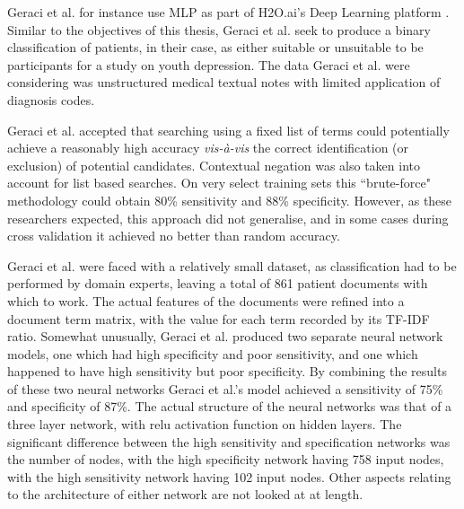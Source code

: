 Geraci et al. for instance use MLP as part of H2O.ai's Deep Learning platform \cite{geraci2017applying}. Similar to the objectives of this thesis, Geraci et al. seek to produce a binary classification of patients, in their case, as either suitable or unsuitable to be participants for a study on youth depression. The data Geraci et al. were considering was unstructured medical textual notes with limited application of diagnosis codes. 

Geraci et al. accepted that searching using a fixed list of terms could potentially achieve a reasonably high accuracy \textit{vis-à-vis} the correct identification (or exclusion) of potential candidates. Contextual negation was also taken into account for list based searches. On very select training sets this ``brute-force" methodology could obtain 80\% sensitivity and 88\% specificity. However, as these researchers expected, this approach did not generalise, and in some cases during cross validation it achieved no better than random accuracy.

Geraci et al. were faced with a relatively small dataset, as classification had to be performed by domain experts, leaving a total of 861 patient documents with which to work. The actual features of the documents were refined into a document term matrix, with the value for each term recorded by its TF-IDF ratio. Somewhat unusually, Geraci et al. produced two separate neural network models, one which had high specificity and poor sensitivity, and one which happened to have high sensitivity but poor specificity. By combining the results of these two neural networks Geraci et al.'s model achieved a sensitivity of 75\% and specificity of 87\%. The actual structure of the neural networks was that of a three layer network, with relu activation function on hidden layers. The significant difference between the high sensitivity and specification networks was the number of nodes, with the high specificity network having 758 input nodes, with the high sensitivity network having 102 input nodes. Other aspects relating to the architecture of either network are not looked at at length.


